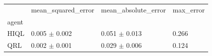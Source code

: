 \begin{tabular}{llll}
\toprule
 & mean_squared_error & mean_absolute_error & max_error \\
agent &  &  &  \\
\midrule
HIQL & 0.005 $\pm$ 0.002 & 0.051 $\pm$ 0.013 & 0.266 \\
QRL & 0.002 $\pm$ 0.001 & 0.029 $\pm$ 0.006 & 0.124 \\
\bottomrule
\end{tabular}
